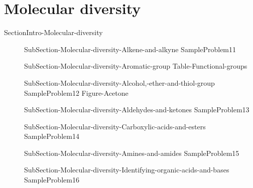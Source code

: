 \documentclass[main.tex]{subfiles}
\begin{document}
\section{Molecular diversity}{SectionIntro-Molecular-diversity}
\sloppy\begin{description}
\item[]{SubSection-Molecular-diversity-Alkene-and-alkyne}
{SampleProblem11}
 \item[]{SubSection-Molecular-diversity-Aromatic-group}
 {Table-Functional-groups}
\item[]{SubSection-Molecular-diversity-Alcohol,-ether-and-thiol-group}
{SampleProblem12}
\newpage\hspace{0cm}  {Figure-Acetone}
\item[] {SubSection-Molecular-diversity-Aldehydes-and-ketones}
{SampleProblem13}
\item[]{SubSection-Molecular-diversity-Carboxylic-acids-and-esters}
{SampleProblem14}
 \item[] {SubSection-Molecular-diversity-Amines-and-amides}
  {SampleProblem15}
\item[]{SubSection-Molecular-diversity-Identifying-organic-acids-and-bases}
{SampleProblem16}
 \end{description}
 
 
 
\end{document}
